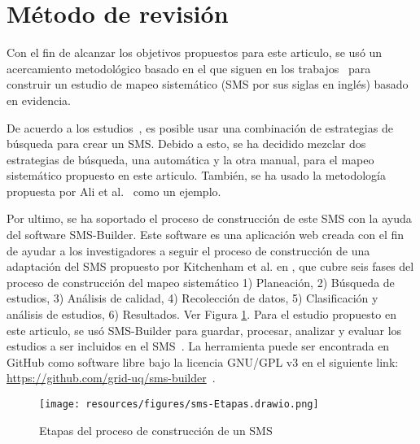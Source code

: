 \section{Método de revisión}\label{sec:metodo-revision}
Con el fin de alcanzar los objetivos propuestos para este articulo, se usó un acercamiento metodológico basado en el que siguen en los trabajos~\cite{Kitchenham2010792, budgen2008using} para construir un estudio de mapeo sistemático (SMS por sus siglas en inglés) basado en evidencia.

De acuerdo a los estudios~\cite{Erica2017HybridSS, Nguyen201562}, es posible usar una combinación de estrategias de búsqueda para crear un SMS. Debido a esto, se ha decidido mezclar dos estrategias de búsqueda, una automática y la otra manual, para el mapeo sistemático propuesto en este articulo. También, se ha usado la metodología propuesta por Ali et al.~\cite{Ali201988196} como un ejemplo.

Por ultimo, se ha soportado el proceso de construcción de este SMS con la ayuda del software SMS-Builder. Este software es una aplicación web creada con el fin de ayudar a los investigadores a seguir el proceso de construcción de una adaptación del SMS propuesto por Kitchenham et al. en \cite{Kitchenham2010792}, que cubre seis fases del proceso de construcción del mapeo sistemático 1) Planeación, 2) Búsqueda de estudios, 3) Análisis de calidad, 4) Recolección de datos, 5) Clasificación y análisis de estudios, 6) Resultados. Ver Figura \ref{figure:Stages}.
Para el estudio propuesto en este articulo, se usó SMS-Builder para guardar, procesar, analizar y evaluar los estudios a ser incluidos en el SMS~\cite{Candela2022100935}. La herramienta puede ser encontrada en GitHub como software libre bajo la licencia GNU/GPL v3 en el siguiente link: \url{https://github.com/grid-uq/sms-builder}~\cite{Candela2022100935}.

\begin{figure}[htbp]
	\centering
	\texttt{[image: resources/figures/sms-Etapas.drawio.png]}
	\caption{Etapas del proceso de construcción de un SMS}
	\label{figure:Stages}
\end{figure}













